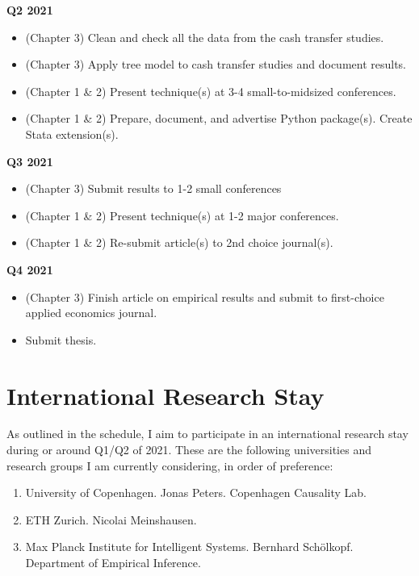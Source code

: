 \documentclass[a4paper,12pt]{article}
\begin{document}
\textbf{Q2 2021}

\begin{itemize}
\item (Chapter 3) Clean and check all the data from the cash transfer studies.
\item (Chapter 3) Apply tree model to cash transfer studies and document results.
\item (Chapter 1 \& 2) Present technique(s) at 3-4 small-to-midsized conferences.
\item (Chapter 1 \& 2) Prepare, document, and advertise Python package(s). Create Stata extension(s).
\end{itemize}

\textbf{Q3 2021}

\begin{itemize}
\item (Chapter 3) Submit results to 1-2 small conferences
\item (Chapter 1 \& 2) Present technique(s) at 1-2 major conferences.
\item (Chapter 1 \& 2) Re-submit article(s) to 2nd choice journal(s).
\end{itemize}

\textbf{Q4 2021}

\begin{itemize}
\item (Chapter 3) Finish article on empirical results and submit to first-choice applied economics journal.
\item Submit thesis.
\end{itemize}


\section{International Research Stay}

As outlined in the schedule, I aim to participate in an international research stay during or around Q1/Q2 of 2021. These are the following universities and research groups I am currently considering, in order of preference:

\begin{enumerate}
\item University of Copenhagen. Jonas Peters. Copenhagen Causality Lab.
\item ETH Zurich. Nicolai Meinshausen.
\item Max Planck Institute for Intelligent Systems. Bernhard Schölkopf. Department of Empirical Inference.
\end{enumerate}
\end{document}
